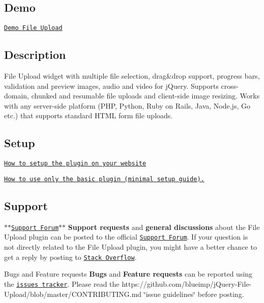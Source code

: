 \subsection*{Demo}

\href{http://blueimp.github.io/jQuery-File-Upload/}{\tt Demo File Upload}

\subsection*{Description}

File Upload widget with multiple file selection, drag\&drop support, progress bars, validation and preview images, audio and video for j\-Query. Supports cross-\/domain, chunked and resumable file uploads and client-\/side image resizing. Works with any server-\/side platform (P\-H\-P, Python, Ruby on Rails, Java, Node.\-js, Go etc.) that supports standard H\-T\-M\-L form file uploads.

\subsection*{Setup}


\begin{DoxyItemize}
\item \href{https://github.com/blueimp/jQuery-File-Upload/wiki/Setup}{\tt How to setup the plugin on your website}
\item \href{https://github.com/blueimp/jQuery-File-Upload/wiki/Basic-plugin}{\tt How to use only the basic plugin (minimal setup guide).}
\end{DoxyItemize}

\subsection*{Support}


\begin{DoxyItemize}
\item $\ast$$\ast$\href{https://groups.google.com/d/forum/jquery-fileupload}{\tt Support Forum}$\ast$$\ast$ {\bfseries Support requests} and {\bfseries general discussions} about the File Upload plugin can be posted to the official \href{https://groups.google.com/d/forum/jquery-fileupload}{\tt Support Forum}. If your question is not directly related to the File Upload plugin, you might have a better chance to get a reply by posting to \href{http://stackoverflow.com/questions/tagged/blueimp+jquery+file-upload}{\tt Stack Overflow}.
\item Bugs and Feature requests {\bfseries Bugs} and {\bfseries Feature requests} can be reported using the \href{https://github.com/blueimp/jQuery-File-Upload/issues}{\tt issues tracker}. Please read the https\-://github.com/blueimp/j\-Query-\/\-File-\/\-Upload/blob/master/\-C\-O\-N\-T\-R\-I\-B\-U\-T\-I\-N\-G.\-md \char`\"{}issue guidelines\char`\"{} before posting.
\end{DoxyItemize}

